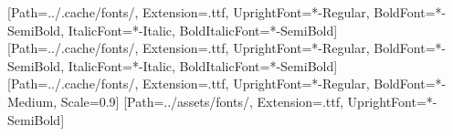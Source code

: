 \usepackage{fontspec}
\setmainfont{IBMPlexSans}[Path=../.cache/fonts/, Extension=.ttf, UprightFont=*-Regular,
  BoldFont=*-SemiBold, ItalicFont=*-Italic, BoldItalicFont=*-SemiBold]
\setsansfont{IBMPlexSans}[Path=../.cache/fonts/, Extension=.ttf, UprightFont=*-Regular,
  BoldFont=*-SemiBold, ItalicFont=*-Italic, BoldItalicFont=*-SemiBold]
\setmonofont{IBMPlexMono}[Path=../.cache/fonts/, Extension=.ttf, UprightFont=*-Regular,
  BoldFont=*-Medium, Scale=0.9]
\newfontfamily{}[Path=../assets/fonts/, Extension=.ttf, UprightFont=*-SemiBold]
\usepackage{xcolor}
\color{ink}
\usepackage{titlesec}
\titleformat{\section}{\editorial\Large}{}{0pt}{}
\titleformat{\subsection}{\editorial\large}{}{0pt}{}
\titlespacing*{\section}{0pt}{1.4em}{0.4em}
\linespread{1.12}
\setlength{\parskip}{0.5em}
\setlength{\parindent}{0pt}
\makeatletter
\renewcommand{\maketitle}{%
  {\color{cobalt}\ttfamily\small PLAIN-LANGUAGE REPORT\par}\vspace{0.5em}
  {\editorial\fontsize{22}{26}\selectfont\@title\par}\vspace{0.4em}
  {\large\color{subtle}Ts65Dn mouse cortex · 77 proteins · 72 mice\par}\vspace{1.2em}}
\makeatother
\usepackage{graphicx}
